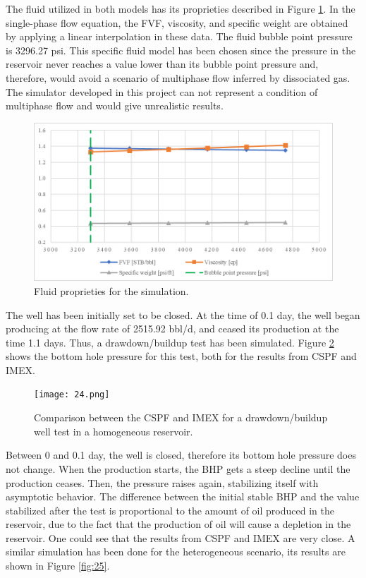 The fluid utilized in both models has its proprieties described in Figure \ref{fig:30}. In the single-phase flow equation, the FVF, viscosity, and specific weight are obtained by applying a linear interpolation in these data. The fluid bubble point pressure is 3296.27 psi. This specific fluid model has been chosen since the pressure in the reservoir never reaches a value lower than its bubble point pressure and, therefore, would avoid a scenario of multiphase flow inferred by dissociated gas. The simulator developed in this project can not represent a condition of multiphase flow and would give unrealistic results.

\begin{figure}[h]
	\centering
	\includegraphics[width=1\linewidth]{Images/30}
	\caption{Fluid proprieties for the simulation.}
	\label{fig:30}
\end{figure}

The well has been initially set to be closed. At the time of 0.1 day, the well began producing at the flow rate of 2515.92 bbl/d, and ceased its production at the time 1.1 days. Thus, a drawdown/buildup test has been simulated. Figure \ref{fig:24} shows the bottom hole pressure for this test, both for the results from CSPF and IMEX.

\begin{figure}[h]
	\centering
	\texttt{[image: 24.png]}
	\caption{Comparison between the CSPF and IMEX for a drawdown/buildup well test in a homogeneous reservoir.}
	\label{fig:24}
\end{figure}

Between 0 and 0.1 day, the well is closed, therefore its bottom hole pressure does not change. When the production starts, the BHP gets a steep decline until the production ceases. Then, the pressure raises again, stabilizing itself with asymptotic behavior. The difference between the initial stable BHP and the value stabilized after the test is proportional to the amount of oil produced in the reservoir, due to the fact that the production of oil will cause a depletion in the reservoir. One could see that the results from CSPF and IMEX are very close. A similar simulation has been done for the heterogeneous scenario, its results are shown in Figure \ref{fig:25}.

